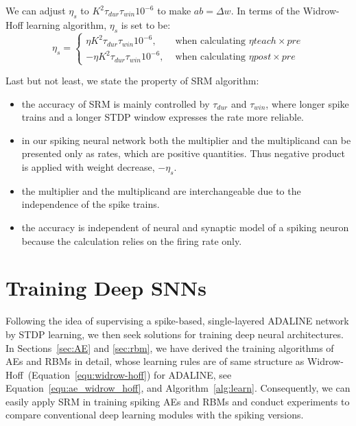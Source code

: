 We can adjust $\eta_s$ to $ K^2 \tau_{dur} \tau_{win}10^{-6}$ to make $ab = \Delta w$.
In terms of the Widrow-Hoff learning algorithm, $\eta_s$ is set to be:
\begin{equation}
	\eta_s=
    \left\{
    \begin{aligned} 
    \eta K^2 \tau_{dur} \tau_{win}10^{-6}, &\text{ when calculating } \eta teach \times pre\\
    - \eta K^2 \tau_{dur} \tau_{win}10^{-6}, &\text{ when calculating } \eta post \times pre
    \end{aligned}
    \right.
    \label{equ:eta_s}
\end{equation}

Last but not least, we state the property of SRM algorithm:
\begin{itemize}
	\item the accuracy of SRM is mainly controlled by $\tau_{dur}$ and $\tau_{win}$, where longer spike trains and a longer STDP window expresses the rate more reliable.
	\item in our spiking neural network both the multiplier and the multiplicand can be presented only as rates, which are positive quantities.
	Thus negative product is applied with weight decrease, $-\eta_s$. 
	\item the multiplier and the multiplicand are interchangeable due to the independence of the spike trains. 
	\item the accuracy is independent of neural and synaptic model of a spiking neuron because the calculation relies on the firing rate only.
\end{itemize}


\section{Training Deep SNNs}
\label{sec:dSNN}
Following the idea of supervising a spike-based, single-layered ADALINE network by STDP learning, we then seek solutions for training deep neural architectures.
In Sections~\ref{sec:AE} and \ref{sec:rbm}, we have derived the training algorithms of AEs and RBMs in detail, whose learning rules are of same structure as Widrow-Hoff~(Equation~\ref{equ:widrow-hoff}) for ADALINE, see Equation~\ref{equ:ae_widrow_hoff}, and Algorithm~\ref{alg:learn}.
Consequently, we can easily apply SRM in training spiking AEs and RBMs and conduct experiments to compare conventional deep learning modules with the spiking versions.

